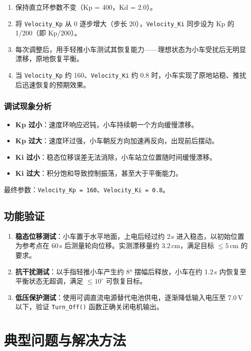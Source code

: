 \documentclass[12pt,a4paper,UTF8]{ctexrep}
\begin{document}
\begin{enumerate}
  \item 保持直立环参数不变（Kp = 400，Kd = 2.0）。
  \item 将 \texttt{Velocity\_Kp} 从 0 逐步增大（步长 20），\texttt{Velocity\_Ki} 同步设为 Kp 的 1/200（即 Kp/200）。
  \item 每次调整后，用手轻推小车测试其恢复能力——理想状态为小车受扰后无明显漂移，原地恢复平衡。
  \item 当 \texttt{Velocity\_Kp} 约 160、\texttt{Velocity\_Ki} 约 0.8 时，小车实现了原地站稳、推扰后迅速恢复的预期效果。
\end{enumerate}

\subsubsection{调试现象分析}

\begin{itemize}
  \item \textbf{Kp 过小}：速度环响应迟钝，小车持续朝一个方向缓慢漂移。
  \item \textbf{Kp 过大}：速度环过强，小车朝反方向加速再反向，出现前后摆动。
  \item \textbf{Ki 过小}：稳态位移误差无法消除，小车站立位置随时间缓慢漂移。
  \item \textbf{Ki 过大}：积分饱和导致控制振荡，甚至大于平衡能力。
\end{itemize}

最终参数：\texttt{Velocity\_Kp = 160}、\texttt{Velocity\_Ki = 0.8}。

\subsection{功能验证}

\begin{enumerate}
  \item \textbf{稳态位移测试}：小车置于水平地面，上电后经过约 2\,s 进入稳态，以初始位置为参考点在 60\,s 后测量轮向位移。实测漂移量约 3.2\,cm，满足目标 $\leq 5$\,cm 的要求。
  \item \textbf{抗干扰测试}：以手指轻推小车产生约 8° 摆幅后释放，小车在约 1.2\,s 内恢复至平衡状态无超调，满足 $\leq 10^{\circ}$ 可恢复目标。
  \item \textbf{低压保护测试}：使用可调直流电源替代电池供电，逐渐降低输入电压至 7.0\,V 以下，验证 \texttt{Turn\_Off()} 函数正确关闭电机输出。
\end{enumerate}

\section{典型问题与解决方法}
\end{document}

